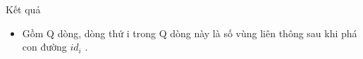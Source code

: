 Kết quả
\begin{itemize}
	\item     Gồm Q dòng, dòng thứ i trong Q dòng này là số vùng liên thông sau khi phá con đường $id_{i}$    .   
\end{itemize}